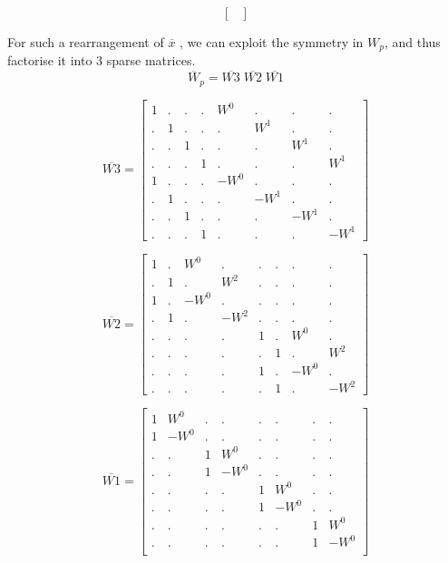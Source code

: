 \documentclass[journal,12pt,twocolumn]{IEEEtran}
\renewcommand\thesection{\arabic{section}}
\begin{document}
\begin{enumerate}[label=\thesection.\arabic*.,ref=\thesection.\theenumi]
\begin{equation}
\begin{bmatrix}
    \end{bmatrix}
\end{equation}

For such a rearrangement of $\overline{x}$ , we can exploit the symmetry in $W_{p}$, and thus factorise it into 3 sparse matrices.
\begin{equation}
    \overline{W}_{p} = \overline{W3} \; \overline{W2}\;\overline{W1}
\end{equation}


\begin{equation}
\overline{W3}
=
\begin{bmatrix}

1&.&.&.&W^{0}&.&.&. \\
.&1&.&.&.&W^{1}&.&. \\
.&.&1&.&.&.&W^{1}&. \\
.&.&.&1&.&.&.&W^{1} \\
1&.&.&.&-W^{0}&.&.&. \\
.&1&.&.&.&-W^{1}&.&. \\
.&.&1&.&.&.&-W^{1}&. \\
.&.&.&1&.&.&.&-W^{1} 

\end{bmatrix}
\end{equation}

\begin{equation}
\overline{W2}
=
\begin{bmatrix}
1&.&W^{0}&.&.&.&.&.\\
.&1&.&W^{2}&.&.&.&.\\
1&.&-W^{0}&.&.&.&.&.\\
.&1&.&-W^{2}&.&.&.&.\\
.&.&.&.&1&.&W^{0}&.\\
.&.&.&.&.&1&.&W^{2}\\
.&.&.&.&1&.&-W^{0}&.\\
.&.&.&.&.&1&.&-W^{2} 
\end{bmatrix}
\end{equation}

\begin{equation}
\overline{W1}
=
\begin{bmatrix}
1&W^{0}&.&.&.&.&.&. \\
1&-W^{0}&.&.&.&.&.&. \\
.&.&1&W^{0}&.&.&.&.\\
.&.&1&-W^{0}&.&.&.&.\\
.&.&.&.&1&W^{0}&.&.\\
.&.&.&.&1&-W^{0}&.&.\\
.&.&.&.&.&.&1&W^{0}\\
.&.&.&.&.&.&1&-W^{0}\\


\end{bmatrix}
\end{equation}
\end{enumerate}
\end{document}

